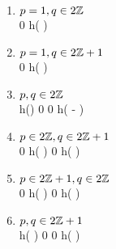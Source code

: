 \begin{enumerate}[(1)]
	\item $p=1,q\in2\mathbb{Z}$
		\\
\hspace*{0cm}\commonShift\mytableThreeTwo	%
{}		{}
{\pipxStack}			{0}
{\pimxStack}			{h\left(  \right)}
	\item $p=1,q\in2\mathbb{Z}+1$\\
\hspace*{0cm}\commonShift\mytableThreeTwo	%
{}		{}
{\pipxStack}			{0}
{\pimxStack}			{h\left(  \right)}
	\item $p,q\in2\mathbb{Z}$\\
\hspace*{-0cm}\commonShift\mytable	%
{}		{\pipyStack}				{\pimyStack}
{\pipxStack}	{h\left(\right)} 	{0}
{\pipxStack}	{0} 					{h\left( - \right)}
\item $p\in2\mathbb{Z},q\in2\mathbb{Z}+1$\\
\commonShift\mytable	%
{}		{\pipyStack}{\pimyStack}
{\pipxStack} {0}		{h\left(  \right)}
{\pimxStack} {0} {h\left(  \right)}
\item $p\in2\mathbb{Z}+1,q\in2\mathbb{Z}$\\
\commonShift\mytable	%
{}		{\pipyStack}		{\pimyStack}
{\pipxStack}			{0} 			{h\left(  \right)}	
{\pimxStack} 			{0} 			{h\left(  \right)}
\item $p,q\in2\mathbb{Z}+1$\\
\commonShift\mytable	%
{}		{\pipyStack}	{\pimyStack}
{}		{h\left(  \right)}			{0}
{}		{0}	{h\left(  \right)}	
\end{enumerate}
